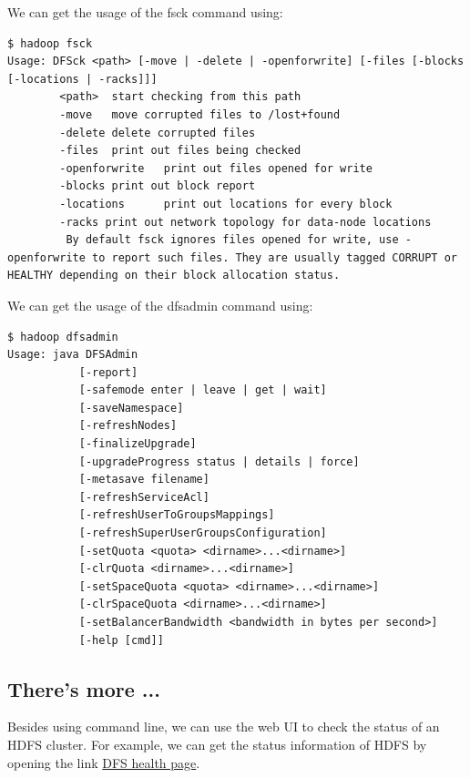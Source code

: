 We can get the usage of the fsck command using:
\lstset{style=bashstyle}
\begin{lstlisting}
$ hadoop fsck
Usage: DFSck <path> [-move | -delete | -openforwrite] [-files [-blocks [-locations | -racks]]]
        <path>  start checking from this path
        -move   move corrupted files to /lost+found
        -delete delete corrupted files
        -files  print out files being checked
        -openforwrite   print out files opened for write
        -blocks print out block report
        -locations      print out locations for every block
        -racks print out network topology for data-node locations
         By default fsck ignores files opened for write, use -openforwrite to report such files. They are usually tagged CORRUPT or HEALTHY depending on their block allocation status.
\end{lstlisting}

We can get the usage of the dfsadmin command using: 
\lstset{style=bashstyle}
\begin{lstlisting}
$ hadoop dfsadmin
Usage: java DFSAdmin
           [-report]
           [-safemode enter | leave | get | wait]
           [-saveNamespace]
           [-refreshNodes]
           [-finalizeUpgrade]
           [-upgradeProgress status | details | force]
           [-metasave filename]
           [-refreshServiceAcl]
           [-refreshUserToGroupsMappings]
           [-refreshSuperUserGroupsConfiguration]
           [-setQuota <quota> <dirname>...<dirname>]
           [-clrQuota <dirname>...<dirname>]
           [-setSpaceQuota <quota> <dirname>...<dirname>]
           [-clrSpaceQuota <dirname>...<dirname>]
           [-setBalancerBandwidth <bandwidth in bytes per second>]
           [-help [cmd]]
\end{lstlisting}

\subsection*{There's more ...}
Besides using command line, we can use the web UI to check the status of an HDFS cluster. For example, we can get the status information of HDFS by opening the link \href{http://master:50070/dfshealth.jsp}{DFS health page}.

